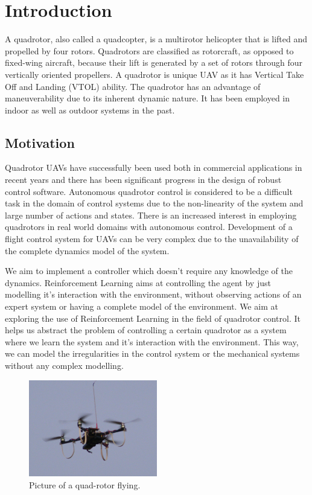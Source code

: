 \documentclass[hidelinks,BTech]{iitmdiss}
\begin{document}
\chapter{Introduction}
A quadrotor, also called a quadcopter, is a multirotor helicopter that is lifted and propelled by four rotors. Quadrotors are classified as rotorcraft, as opposed to fixed-wing aircraft, because their lift is generated by a set of rotors through four vertically oriented propellers. A quadrotor is unique UAV as it has Vertical Take Off and Landing (VTOL) ability. The quadrotor has an advantage of maneuverability due to its inherent dynamic nature. It has been employed in indoor\cite{IndoorQuad} as well as outdoor systems\cite{OutdoorQuad} in the past.

\section{Motivation}
Quadrotor UAVs have successfully been used both in commercial applications in recent years and there has been significant progress in the design of robust control software. Autonomous quadrotor control is considered to be a difficult task in the domain of control systems due to the non-linearity of the system and large number of actions and states. There is an increased interest in employing quadrotors in real world domains with autonomous control. Development of a flight control system for UAVs can be very complex due to the unavailability of the complete dynamics model of the system. 


We aim to implement a controller which doesn't require any knowledge of the dynamics. Reinforcement Learning aims at controlling the agent by just modelling it's interaction with the environment, without observing actions of an expert system or having a complete model of the environment. We aim at exploring the use of Reinforcement Learning in the field of quadrotor control. It helps us abstract the problem of controlling a certain quadrotor as a system where we learn the system and it's interaction with the environment. This way, we can model the irregularities in the control system or the mechanical systems without any complex modelling. 

\begin{figure}[H]
  \centering
    \includegraphics[width=0.5\textwidth]{quadrotor.jpg}
    \caption{Picture of a quad-rotor flying.}
\end{figure}
\end{document}
